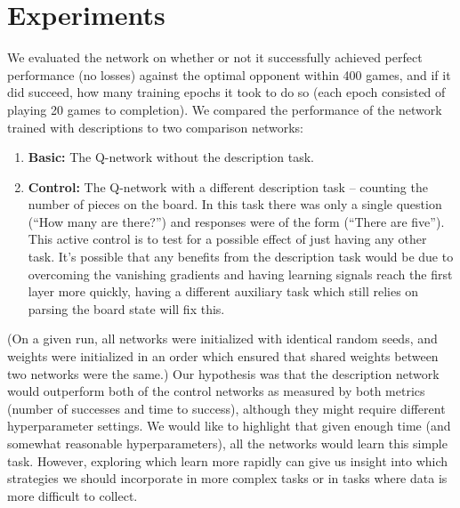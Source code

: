 \documentclass{article} %
\begin{document}
\section{Experiments}
We evaluated the network on whether or not it successfully achieved perfect performance (no losses) against the optimal opponent within 400 games, and if it did succeed, how many training epochs it took to do so (each epoch consisted of playing 20 games to completion). We compared the performance of the network trained with descriptions to two comparison networks:
\begin{enumerate}
\item \textbf{Basic:} The Q-network without the description task.
\item \textbf{Control:} The Q-network with a different description task -- counting the number of pieces on the board. In this task there was only a single question (``How many are there?'') and responses were of the form (``There are five''). This active control is to test for a possible effect of just having any other task. It's possible that any benefits from the description task would be due to overcoming the vanishing gradients and having learning signals reach the first layer more quickly, having a different auxiliary task which still relies on parsing the board state will fix this.
\end{enumerate}
(On a given run, all networks were initialized with identical random seeds, and weights were initialized in an order which ensured that shared weights between two networks were the same.) Our hypothesis was that the description network would outperform both of the control networks as measured by both metrics (number of successes and time to success), although they might require different hyperparameter settings. We would like to highlight that given enough time (and somewhat reasonable hyperparameters), all the networks would learn this simple task. However, exploring which learn more rapidly can give us insight into which strategies we should incorporate in more complex tasks or in tasks where data is more difficult to collect.
\end{document}
